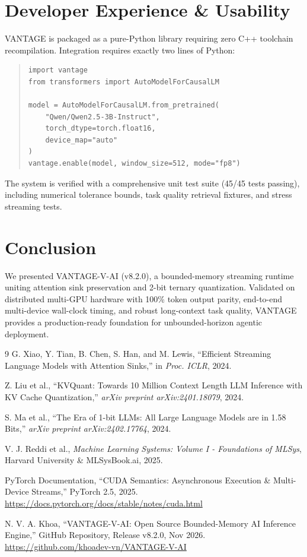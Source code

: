 \documentclass[10pt,twocolumn,letterpaper]{article}
\begin{document}
\section{Developer Experience \& Usability}
VANTAGE is packaged as a pure-Python library requiring zero C++ toolchain recompilation. Integration requires exactly two lines of Python:

\begin{quote}
\begin{verbatim}
import vantage
from transformers import AutoModelForCausalLM

model = AutoModelForCausalLM.from_pretrained(
    "Qwen/Qwen2.5-3B-Instruct",
    torch_dtype=torch.float16,
    device_map="auto"
)
vantage.enable(model, window_size=512, mode="fp8")
\end{verbatim}
\end{quote}

The system is verified with a comprehensive unit test suite (45/45 tests passing), including numerical tolerance bounds, task quality retrieval fixtures, and stress streaming tests.

\section{Conclusion}
We presented VANTAGE-V-AI (v8.2.0), a bounded-memory streaming runtime uniting attention sink preservation and 2-bit ternary quantization. Validated on distributed multi-GPU hardware with 100\% token output parity, end-to-end multi-device wall-clock timing, and robust long-context task quality, VANTAGE provides a production-ready foundation for unbounded-horizon agentic deployment.

\begin{thebibliography}{9}
G. Xiao, Y. Tian, B. Chen, S. Han, and M. Lewis, ``Efficient Streaming Language Models with Attention Sinks,'' in \emph{Proc. ICLR}, 2024.

Z. Liu et al., ``KVQuant: Towards 10 Million Context Length LLM Inference with KV Cache Quantization,'' \emph{arXiv preprint arXiv:2401.18079}, 2024.

S. Ma et al., ``The Era of 1-bit LLMs: All Large Language Models are in 1.58 Bits,'' \emph{arXiv preprint arXiv:2402.17764}, 2024.

V. J. Reddi et al., \emph{Machine Learning Systems: Volume I - Foundations of MLSys}, Harvard University \& MLSysBook.ai, 2025.

PyTorch Documentation, ``CUDA Semantics: Asynchronous Execution \& Multi-Device Streams,'' PyTorch 2.5, 2025. \url{https://docs.pytorch.org/docs/stable/notes/cuda.html}

N. V. A. Khoa, ``VANTAGE-V-AI: Open Source Bounded-Memory AI Inference Engine,'' GitHub Repository, Release v8.2.0, Nov 2026. \url{https://github.com/khoadev-vn/VANTAGE-V-AI}
\end{thebibliography}
\end{document}
